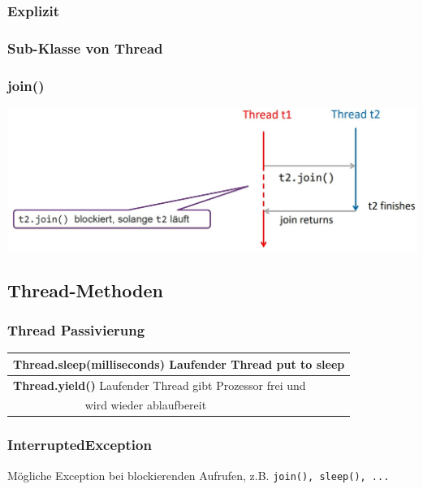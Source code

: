 {    \subsubsection{Explizit}
        \vspace{-0.3cm}
        
        \vspace{-0.2cm}

    \subsubsection{Sub-Klasse von Thread}
        \vspace{-0.3cm}
        
        \vspace{-0.2cm}

    \subsubsection{join()}
        \includegraphics[width=0.6\linewidth]{pictures/thread-join.jpg}
        \vspace{-0.3cm}

\subsection{Thread-Methoden}
    \subsubsection{Thread Passivierung}
        \begin{tabular}{l}
            \textbf{Thread.sleep(milliseconds)} Laufender Thread put to sleep\\ \hline
            \textbf{Thread.yield()} Laufender Thread gibt Prozessor frei und\\
            $\qquad\qquad\qquad$ wird wieder ablaufbereit\\
        \end{tabular}
        \vspace{-0.3cm} 

    \subsubsection{InterruptedException}
        Mögliche Exception bei blockierenden Aufrufen, z.B. \verb|join(), sleep(), ...|

}
